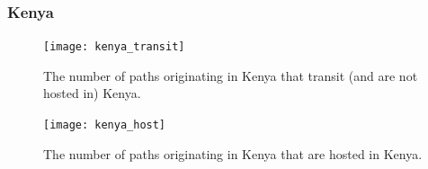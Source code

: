 \subsubsection{Kenya}

\begin{figure}[t!]
\centering
\texttt{[image: kenya\_transit]}
\caption{The number of paths originating in Kenya that transit (and are not hosted in) Kenya.}
\label{fig:host}
\end{figure} 

\begin{figure}[t!]
\centering
\texttt{[image: kenya\_host]}
\caption{The number of paths originating in Kenya that are hosted in Kenya.}
\label{fig:host}
\end{figure} 
